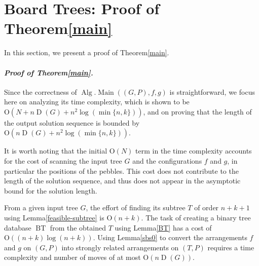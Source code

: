 \documentclass[letter,11pt]{article}
\newcommand{\white}{\qquad{\framebox{\rule{0pt}{4pt}}}}
\newcommand{\owari}{\hfill\white}
\theoremstyle{definition}
\theoremstyle{definition}
\DeclareMathOperator{\BT}{BT}
\DeclareMathOperator{\Alg}{Alg}
\DeclareMathOperator{\Main}{Main}
\DeclareMathOperator{\D}{D}
\newcommand{\1}{\boldmath$~1~$\unboldmath}
\newcommand{\Ord}{\mathrm{O}}
\newcommand{\qedgo}{\vspace{0.35cm}}
\newcommand{\tume}{\hspace*{0.2em}}
\newenvironment{Proofof}[1]{\expandafter
\paragraph{{\it Proof of #1.}}}{\hspace{5mm}\owari\qedgo}
\begin{document}
\section{Board Trees: Proof of Theorem\tume\ref{main}}\label{Main1Proof}

In this section, we present a proof of Theorem\tume\ref{main}.

\noindent
\begin{Proofof}{Theorem\tume\ref{main}}
Since the correctness of $\Alg.\Main((G, P), f, g)$ is straightforward, 
we focus here on analyzing its time complexity, which is shown to be 
$\Ord(N + n\D(G) + n^2\log(\min\{n,k\}))$, 
and on proving that the length of the output solution sequence is bounded by 
$\Ord(n\D(G) + n^2\log(\min\{n,k\}))$. 

It is worth noting that the initial $\Ord(N)$ term in the time complexity accounts 
for the cost of scanning the input tree $G$ and the configurations $f$ and $g$, 
in particular the positions of the pebbles. 
This cost does not contribute to the length of the solution sequence, and thus 
does not appear in the asymptotic bound for the solution length.

From a given input tree $G$, the effort of finding its subtree $T$ of order $n+k+1$ using Lemma\tume\ref{feasible-subtree} is $\Ord(n+k)$.
The task of creating a binary tree database $\BT$ from the obtained $T$ using Lemma\tume\ref{BT} has a cost of $\Ord((n+k)\log(n+k))$.
Using Lemma\tume\ref{sbs0} to convert the arrangements $f$ and $g$ on $(G,P)$ into strongly related arrangements on $(T,P)$ requires a time complexity and number of moves of at most $\Ord(n\D(G))$.



\end{Proofof}
\end{document}
